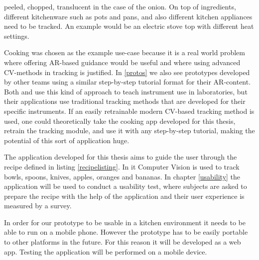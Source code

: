 peeled, chopped, translucent in the case of the onion. On top of ingredients, 
different kitchenware such as pots and pans, and also different kitchen 
appliances need to be tracked. An example would be an electric stove top with 
different heat settings. \par
	Cooking was chosen as the example use-case because it is a real world 
problem where offering AR-based guidance would be useful and where using 
advanced CV-methods in tracking is justified. In \ref{protos} we also see 
prototypes developed by other teams using a similar step-by-step tutorial 
format for their AR-content. Both \textcite{pylvanainen} and 
\textcite{reyesEtAl2016} use this kind of approach to teach instrument use in 
laboratories, but their applications use traditional tracking methods that 
are developed for their specific instruments. If an easily retrainable modern 
CV-based tracking method is used, one could theoretically take the cooking 
app developed for this thesis, retrain the tracking module, and use it with 
any step-by-step tutorial, making the potential of this sort of application 
huge. \par
	The application developed for this thesis aims to guide the user 
through the recipe defined in listing \ref{recipelisting}. In it Computer 
Vision is used to track bowls, spoons, knives, apples, oranges and bananas. 
In chapter \ref{usability} the application will be used to conduct a usability 
test, where subjects are asked to prepare the recipe with the help of the 
application and their user experience is measured by a survey. \par
	In order for our prototype to be usable in a kitchen environment it 
needs to be able to run on a mobile phone. However the prototype has to be 
easily portable to other platforms in the future. 
For this reason it will be developed as a web app. Testing the application 
will be performed on a mobile device.

